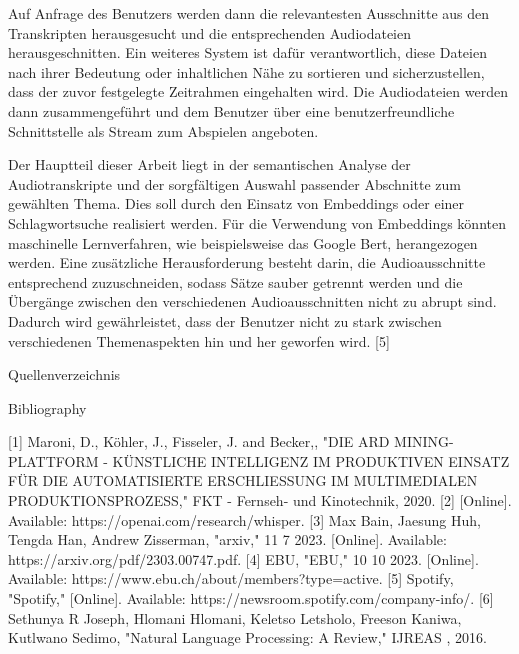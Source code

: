 Auf Anfrage des Benutzers werden dann die relevantesten Ausschnitte aus den Transkripten herausgesucht und die entsprechenden Audiodateien herausgeschnitten. Ein weiteres System ist dafür verantwortlich, diese Dateien nach ihrer Bedeutung oder inhaltlichen Nähe zu sortieren und sicherzustellen, dass der zuvor festgelegte Zeitrahmen eingehalten wird. Die Audiodateien werden dann zusammengeführt und dem Benutzer über eine benutzerfreundliche Schnittstelle als Stream zum Abspielen angeboten.

Der Hauptteil dieser Arbeit liegt in der semantischen Analyse der Audiotranskripte und der sorgfältigen Auswahl passender Abschnitte zum gewählten Thema. Dies soll durch den Einsatz von Embeddings oder einer Schlagwortsuche realisiert werden. Für die Verwendung von Embeddings könnten maschinelle Lernverfahren, wie beispielsweise das Google Bert, herangezogen werden. Eine zusätzliche Herausforderung besteht darin, die Audioausschnitte entsprechend zuzuschneiden, sodass Sätze sauber getrennt werden und die Übergänge zwischen den verschiedenen Audioausschnitten nicht zu abrupt sind. Dadurch wird gewährleistet, dass der Benutzer nicht zu stark zwischen verschiedenen Themenaspekten hin und her geworfen wird.
[5]


Quellenverzeichnis

Bibliography

[1] 	Maroni, D., Köhler, J., Fisseler, J. and Becker,, "DIE ARD MINING-PLATTFORM - KÜNSTLICHE INTELLIGENZ IM PRODUKTIVEN EINSATZ FÜR DIE AUTOMATISIERTE ERSCHLIESSUNG IM MULTIMEDIALEN PRODUKTIONSPROZESS," FKT - Fernseh- und Kinotechnik, 2020. 
[2] 	[Online]. Available: https://openai.com/research/whisper.
[3] 	Max Bain, Jaesung Huh, Tengda Han, Andrew Zisserman, "arxiv," 11 7 2023. [Online]. Available: https://arxiv.org/pdf/2303.00747.pdf.
[4] 	EBU, "EBU," 10 10 2023. [Online]. Available: https://www.ebu.ch/about/members?type=active.
[5] 	Spotify, "Spotify," [Online]. Available: https://newsroom.spotify.com/company-info/.
[6] 	Sethunya R Joseph, Hlomani Hlomani, Keletso Letsholo, Freeson Kaniwa, Kutlwano Sedimo, "Natural Language Processing: A Review," IJREAS , 2016. 




